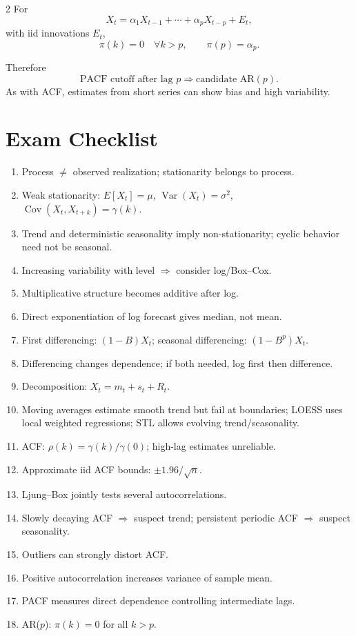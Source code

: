 \documentclass[9pt,a4paper]{extarticle}
\begin{document}
\begin{multicols}{2}
For
\[
X_t=\alpha_1X_{t-1}+\cdots+\alpha_pX_{t-p}+E_t,
\]
with iid innovations \(E_t\),
\[
\boxed{\pi(k)=0\quad\forall k>p},\qquad
\boxed{\pi(p)=\alpha_p}.
\]

Therefore
\[
\boxed{\text{PACF cutoff after lag }p\Rightarrow\text{candidate AR}(p)}.
\]
As with ACF, estimates from short series can show bias and high variability.

\section{Exam Checklist}

\begin{enumerate}
\item Process \(\neq\) observed realization; stationarity belongs to process.
\item Weak stationarity: \(E[X_t]=\mu\), \(\operatorname{Var}(X_t)=\sigma^2\), \(\operatorname{Cov}(X_t,X_{t+k})=\gamma(k)\).
\item Trend and deterministic seasonality imply non-stationarity; cyclic behavior need not be seasonal.
\item Increasing variability with level \(\Rightarrow\) consider log/Box--Cox.
\item Multiplicative structure becomes additive after log.
\item Direct exponentiation of log forecast gives median, not mean.
\item First differencing: \((1-B)X_t\); seasonal differencing: \((1-B^p)X_t\).
\item Differencing changes dependence; if both needed, log first then difference.
\item Decomposition: \(X_t=m_t+s_t+R_t\).
\item Moving averages estimate smooth trend but fail at boundaries; LOESS uses local weighted regressions; STL allows evolving trend/seasonality.
\item ACF: \(\rho(k)=\gamma(k)/\gamma(0)\); high-lag estimates unreliable.
\item Approximate iid ACF bounds: \(\pm1.96/\sqrt n\).
\item Ljung--Box jointly tests several autocorrelations.
\item Slowly decaying ACF \(\Rightarrow\) suspect trend; persistent periodic ACF \(\Rightarrow\) suspect seasonality.
\item Outliers can strongly distort ACF.
\item Positive autocorrelation increases variance of sample mean.
\item PACF measures direct dependence controlling intermediate lags.
\item AR($p$): \(\pi(k)=0\) for all \(k>p\).
\end{enumerate}

\end{multicols}
\end{document}
